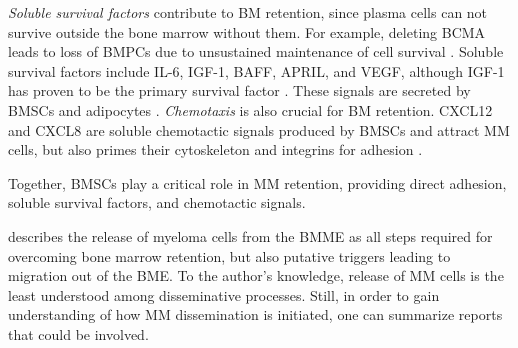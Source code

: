 \emph{Soluble survival factors} contribute to \ac{BM} retention, since plasma
cells can not survive outside the bone marrow without them. For example,
deleting BCMA  leads to loss of
\acp{BMPC}  due to unsustained maintenance of cell survival
\cite{oconnorBCMAEssentialSurvival2004}. Soluble survival factors include IL-6,
IGF-1, BAFF, APRIL, and VEGF, although IGF-1 has proven to be the primary
survival factor \cite{sprynskiRoleIGF1Major2009}. These signals are secreted by
\acp{BMSC} and adipocytes \cite{kiblerAdhesiveInteractionsHuman1998,
    garcia-ortizRoleTumorMicroenvironment2021}. \emph{Chemotaxis} is also crucial
for \ac{BM} retention. CXCL12 and CXCL8 are soluble chemotactic signals produced
by \acp{BMSC} and attract \ac{MM} cells, but also primes their cytoskeleton and
integrins for adhesion \cite{aggarwalChemokinesMultipleMyeloma2006,
    alsayedMechanismsRegulationCXCR42007}.

Together, \acp{BMSC} play a critical role in \ac{MM} retention, providing direct
adhesion, soluble survival factors, and chemotactic signals.


%
\label{sec:intro_myeloma_release}%
\citet{zeissigTumourDisseminationMultiple2020} describes the release of myeloma
cells from the \ac{BMME} as all steps required for overcoming bone marrow
retention, but also putative triggers leading to migration out of the BME. To
the author's knowledge, release of \ac{MM} cells is the least understood among
disseminative processes. Still, in order to gain understanding of how \ac{MM}
dissemination is initiated, one can summarize reports that could be involved.


